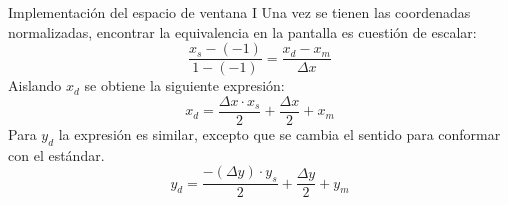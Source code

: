 \documentclass{beamer}
\begin{document}
\begin{frame}{Implementación del espacio de ventana I}
  Una vez se tienen las coordenadas normalizadas, encontrar la equivalencia en la pantalla es cuestión de escalar:
  \begin{equation*}
  \frac{x_s-(-1)}{1-(-1)} = \frac{x_d - x_m}{\Delta x}
  \end{equation*}
  Aislando $x_d$ se obtiene la siguiente expresión:
  \begin{equation*}
  x_d = \frac{\Delta x \cdot x_s}{2}+\frac{\Delta x}{2}+x_m
  \end{equation*}
  Para $y_d$ la expresión es similar, excepto que se cambia el sentido para conformar con el estándar.
  \begin{equation*}
  y_d = \frac{-(\Delta y) \cdot y_s}{2}+\frac{\Delta y}{2}+y_m
  \end{equation*}
\end{frame}
\end{document}
